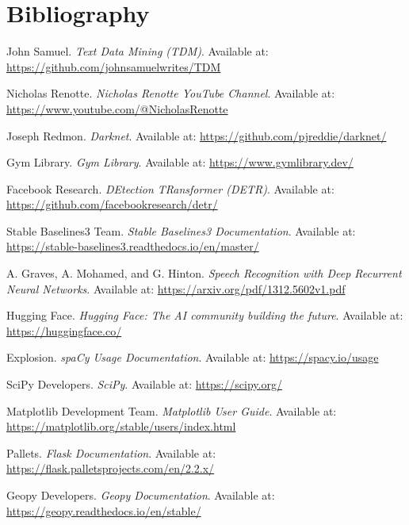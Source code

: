\documentclass{article}
\begin{document}
    \newpage

    \section{Bibliography}\label{sec:bibliography}

    \begin{thebibliography}{9}

        John Samuel.
        \textit{Text Data Mining (TDM)}.
        Available at: \url{https://github.com/johnsamuelwrites/TDM}

        Nicholas Renotte.
        \textit{Nicholas Renotte YouTube Channel}.
        Available at: \url{https://www.youtube.com/@NicholasRenotte}

        Joseph Redmon.
        \textit{Darknet}.
        Available at: \url{https://github.com/pjreddie/darknet/}

        Gym Library.
        \textit{Gym Library}.
        Available at: \url{https://www.gymlibrary.dev/}

        Facebook Research.
        \textit{DEtection TRansformer (DETR)}.
        Available at: \url{https://github.com/facebookresearch/detr/}

        Stable Baselines3 Team.
        \textit{Stable Baselines3 Documentation}.
        Available at: \url{https://stable-baselines3.readthedocs.io/en/master/}

        A. Graves, A. Mohamed, and G. Hinton.
        \textit{Speech Recognition with Deep Recurrent Neural Networks}.
        Available at: \url{https://arxiv.org/pdf/1312.5602v1.pdf}

        Hugging Face.
        \textit{Hugging Face: The AI community building the future}.
        Available at: \url{https://huggingface.co/}

        Explosion.
        \textit{spaCy Usage Documentation}.
        Available at: \url{https://spacy.io/usage}

        SciPy Developers.
        \textit{SciPy}.
        Available at: \url{https://scipy.org/}

        Matplotlib Development Team.
        \textit{Matplotlib User Guide}.
        Available at: \url{https://matplotlib.org/stable/users/index.html}

        Pallets.
        \textit{Flask Documentation}.
        Available at: \url{https://flask.palletsprojects.com/en/2.2.x/}

        Geopy Developers.
        \textit{Geopy Documentation}.
        Available at: \url{https://geopy.readthedocs.io/en/stable/}

    \end{thebibliography}
\end{document}
